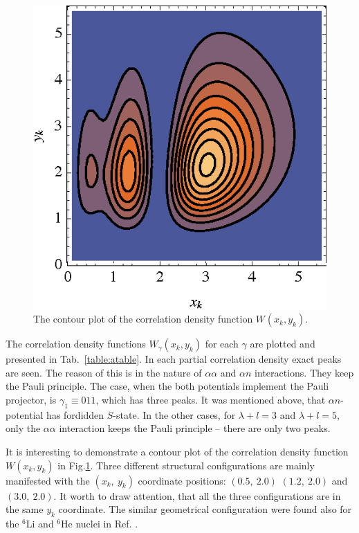 \documentclass[12pt,a4paper,twoside]{article}
\begin{document}
\begin{figure}
\center
\includegraphics[scale=0.8]{counter_plot}
\caption{The contour plot of the correlation density function $W_{}(x_k,y_k)$.}
\label{countour_plot}
\end{figure}



The correlation density functions $W_{\gamma}(x_k,y_k)$  for each $\gamma$ are plotted and presented in Tab.~\ref{table:atable}. In each partial correlation density exact peaks are seen. The reason of this is in the nature of $\alpha \alpha$ and $\alpha n$ interactions. They keep the Pauli principle. The case, when the both potentials implement the Pauli projector, is $\gamma_1\equiv011$, which has three peaks. It was mentioned above, that $\alpha n$-potential has fordidden $S$-state. In the other cases, for $\lambda+l=3$ and $\lambda+l=5$, only the $\alpha \alpha$  interaction keeps the Pauli principle -- there are only two peaks.

It is interesting to demonstrate a contour plot of the correlation density function $W(x_k,y_k)$  in Fig.\ref{countour_plot}. Three different structural configurations are mainly manifested with the $(x_k,~y_k)$ coordinate positions: $(0.5,~ 2.0)$ $(1.2, ~2.0)$ and $(3.0,~ 2.0)$. It worth to draw attention, that all the three configurations are in the same $y_k$ coordinate. The similar geometrical configuration were found also for the $^6$Li and $^6$He nuclei in Ref. \cite{kukulin1986detailed}. 
\end{document}
